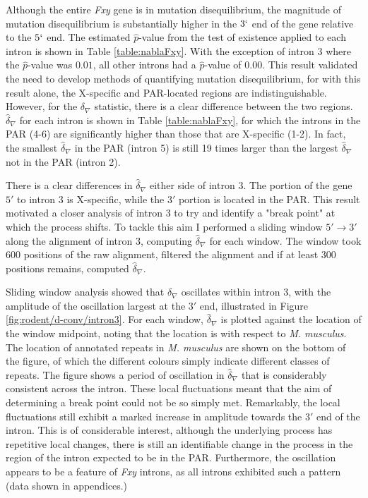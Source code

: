 Although the entire \textit{Fxy} gene is in mutation disequilibrium, the magnitude of mutation disequilibrium is substantially higher in the $3`$ end of the gene relative to the $5`$ end. The estimated $\hat p$-value from the test of existence applied to each intron is shown in Table \ref{table:nablaFxy}. With the exception of intron 3 where the $\hat p$-value was $0.01$, all other introns had a $\hat p$-value of $0.00$. This result validated the need to develop methods of quantifying mutation disequilibrium, for with this result alone, the X-specific and PAR-located regions are indistinguishable. However, for the $\delta_\nabla$ statistic, there is a clear difference between the two regions. $\hat \delta_\nabla$ for each intron is shown in Table \ref{table:nablaFxy}, for which the introns in the PAR (4-6) are significantly higher than those that are X-specific (1-2). In fact, the smallest $\hat \delta_\nabla$ in the PAR (intron 5) is still 19 times larger than the largest $\hat \delta_\nabla$ not in the PAR (intron 2).



There is a clear differences in $\hat \delta_\nabla$ either side of intron 3. The portion of the gene $5'$ to intron 3 is X-specific, while the $3'$ portion is located in the PAR. This result motivated a closer analysis of intron 3 to try and identify a "break point" at which the process shifts. To tackle this aim I performed a sliding window $5' \rightarrow 3'$ along the alignment of intron 3, computing $\hat \delta_\nabla$ for each window. The window took $600$ positions of the raw alignment, filtered the alignment and if at least 300 positions remains, computed $\hat \delta_\nabla$. 

Sliding window analysis showed that $\delta_\nabla$ oscillates within intron 3, with the amplitude of the oscillation largest at the $3'$ end, illustrated in Figure \ref{fig:rodent/d-conv/intron3}. For each window, $\hat \delta_\nabla$ is plotted against the location of the window midpoint, noting that the location is with respect to \textit{M. musculus}. The location of annotated repeats in \textit{M. musculus} are shown on the bottom of the figure, of which the different colours simply indicate different classes of repeats. The figure shows a period of oscillation in $\hat \delta_\nabla$ that is considerably consistent across the intron. These local fluctuations meant that the aim of determining a break point could not be so simply met. Remarkably, the local fluctuations still exhibit a marked increase in amplitude towards the $3'$ end of the intron. This is of considerable interest, although the underlying process has repetitive local changes, there is still an identifiable change in the process in the region of the intron expected to be in the PAR. Furthermore, the oscillation appears to be a feature of \textit{Fxy} introns, as all introns exhibited such a pattern (data shown in appendices.)

